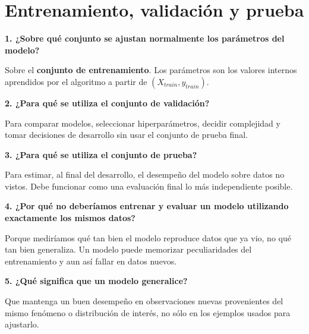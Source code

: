 \documentclass[11pt]{article}
\newcommand{\pregunta}[1]{\vspace{2mm}\textbf{#1}}
\begin{document}
\section{Entrenamiento, validación y prueba}

\begin{center}
\end{center}

\pregunta{1. ¿Sobre qué conjunto se ajustan normalmente los parámetros del modelo?}
\begin{respuesta}
Sobre el \textbf{conjunto de entrenamiento}. Los parámetros son los valores internos aprendidos por el algoritmo a partir de $(X_{train},y_{train})$.
\end{respuesta}

\pregunta{2. ¿Para qué se utiliza el conjunto de validación?}
\begin{respuesta}
Para comparar modelos, seleccionar hiperparámetros, decidir complejidad y tomar decisiones de desarrollo sin usar el conjunto de prueba final.
\end{respuesta}

\pregunta{3. ¿Para qué se utiliza el conjunto de prueba?}
\begin{respuesta}
Para estimar, al final del desarrollo, el desempeño del modelo sobre datos no vistos. Debe funcionar como una evaluación final lo más independiente posible.
\end{respuesta}

\pregunta{4. ¿Por qué no deberíamos entrenar y evaluar un modelo utilizando exactamente los mismos datos?}
\begin{respuesta}
Porque mediríamos qué tan bien el modelo reproduce datos que ya vio, no qué tan bien generaliza. Un modelo puede memorizar peculiaridades del entrenamiento y aun así fallar en datos nuevos.
\end{respuesta}

\pregunta{5. ¿Qué significa que un modelo generalice?}
\begin{respuesta}
Que mantenga un buen desempeño en observaciones nuevas provenientes del mismo fenómeno o distribución de interés, no sólo en los ejemplos usados para ajustarlo.
\end{respuesta}
\end{document}
